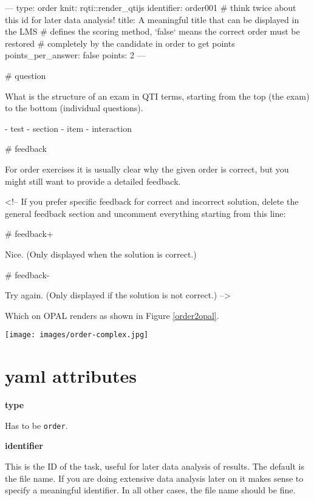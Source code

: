 \documentclass[twoside]{tufte-book}
\newenvironment{Shaded}{}{}
\begin{document}
\begin{Shaded}
\begin{Highlighting}
---
type: order
knit: rqti::render_qtijs
identifier: order001 # think twice about this id for later data analysis!
title: A meaningful title that can be displayed in the LMS
# defines the scoring method, `false` means the correct order must be restored 
# completely by the candidate in order to get points
points_per_answer: false 
points: 2
---

# question

What is the structure of an exam in QTI terms, starting from the top (the exam)
to the bottom (individual questions).

- test
- section
- item
- interaction

# feedback

For order exercises it is usually clear why the given order is correct, but you
might still want to provide a detailed feedback.

<!-- If you prefer specific feedback for correct and incorrect solution, delete
the general feedback section and uncomment everything starting from this line:

# feedback+

Nice. (Only displayed when the solution is correct.)

# feedback-

Try again. (Only displayed if the solution is not correct.)
-->
\end{Highlighting}
\end{Shaded}

Which on OPAL renders as shown in Figure \ref{order2opal}.

\begin{figure*}
\centering
\texttt{[image: images/order-complex.jpg]}
\caption{\label{order2opal}More complex order task rendered in OPAL}
\end{figure*}

\section{yaml attributes}\label{yaml-attributes-5}

\noindent\textbf{type}\label{type-5}

Has to be \texttt{order}.

\noindent\textbf{identifier}\label{identifier-5}

This is the ID of the task, useful for later data analysis of results. The default is the file name. If you are doing extensive data analysis later on it makes sense to
specify a meaningful identifier. In all other cases, the file name should be
fine.
\end{document}
